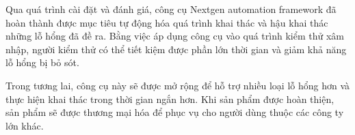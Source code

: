 \documentclass[./../main.tex]{subfiles}
\begin{document}
Qua quá trình cài đặt và đánh giá, công cụ Nextgen automation framework đã hoàn thành được mục tiêu tự động hóa quá trình khai thác và hậu khai thác những lỗ hổng đã đề ra. Bằng việc áp dụng công cụ vào quá trình kiểm thử xâm nhập, người kiểm thử có thể tiết kiệm được phần lớn thời gian và giảm khả năng lỗ hổng bị bỏ sót.

Trong tương lai, công cụ này sẽ được mở rộng để hỗ trợ nhiều loại lỗ hổng hơn và thực hiện khai thác trong thời gian ngắn hơn. Khi sản phẩm được hoàn thiện, sản phẩm sẽ được thương mại hóa để phục vụ cho người dùng thuộc các công ty lớn khác.
\end{document}
